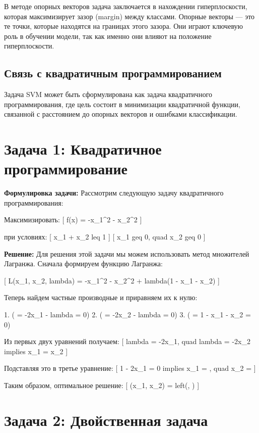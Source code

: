 В методе опорных векторов задача заключается в нахождении гиперплоскости, которая максимизирует зазор (margin) между классами. Опорные векторы — это те точки, которые находятся на границах этого зазора. Они играют ключевую роль в обучении модели, так как именно они влияют на положение гиперплоскости.

\subsection{Связь с квадратичным программированием}

Задача SVM может быть сформулирована как задача квадратичного программирования, где цель состоит в минимизации квадратичной функции, связанной с расстоянием до опорных векторов и ошибками классификации.

\section{Задача 1: Квадратичное программирование}

\textbf{Формулировка задачи:} Рассмотрим следующую задачу квадратичного программирования:

Максимизировать:
[
f(x) = -x_1^2 - x_2^2
]

при условиях:
[
x_1 + x_2 leq 1
]
[
x_1 geq 0, quad x_2 geq 0
]

\textbf{Решение:} Для решения этой задачи мы можем использовать метод множителей Лагранжа. Сначала формируем функцию Лагранжа:

[
L(x_1, x_2, lambda) = -x_1^2 - x_2^2 + lambda(1 - x_1 - x_2)
]

Теперь найдем частные производные и приравняем их к нулю:

1. ( = -2x_1 - lambda = 0)
2. ( = -2x_2 - lambda = 0)
3. ( = 1 - x_1 - x_2 = 0)

Из первых двух уравнений получаем:
[
lambda = -2x_1, quad lambda = -2x_2 implies x_1 = x_2
]

Подставляя это в третье уравнение:
[
1 - 2x_1 = 0 implies x_1 = , quad x_2 = 
]

Таким образом, оптимальное решение:
[
(x_1, x_2) = left(, \right)
]

\section{Задача 2: Двойственная задача}

